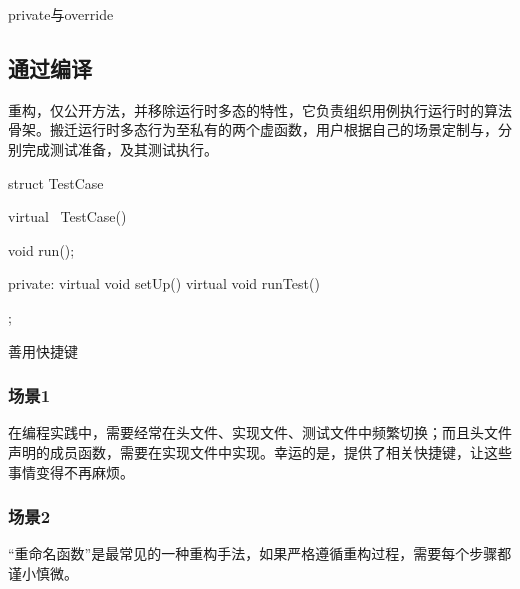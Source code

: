 \begin{content}
\begin{episode}{private与override}
\begin{content}
\end{content}
\end{episode}

\subsection{通过编译}

重构，仅公开方法，并移除运行时多态的特性，它负责组织用例执行运行时的算法骨架。搬迁运行时多态行为至私有的两个虚函数，用户根据自己的场景定制与，分别完成测试准备，及其测试执行。

\begin{leftbar}
 \begin{c++}[caption={\ttfamily{include/mars/core/TestCase.h}}]
struct TestCase {
  virtual ~TestCase() {}

  void run();

private:
  virtual void setUp() {}
  virtual void runTest() {}
};
  \end{c++}
\end{leftbar}

\begin{episode}{善用快捷键}
\begin{content}

\subsubsection{场景1}

在编程实践中，需要经常在头文件、实现文件、测试文件中频繁切换；而且头文件声明的成员函数，需要在实现文件中实现。幸运的是，提供了相关快捷键，让这些事情变得不再麻烦。

\begin{enum}
\end{enum}

\subsubsection{场景2}

“重命名函数”是最常见的一种重构手法，如果严格遵循重构过程，需要每个步骤都谨小慎微。

\begin{enum}
\end{enum}


\end{content}
\end{episode}
\end{content}

